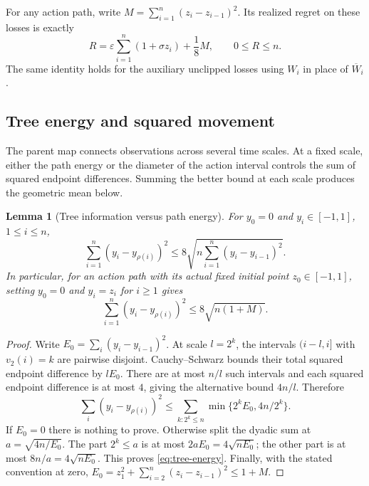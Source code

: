 \documentclass[11pt]{article}
\newtheorem{lemma}[theorem]{Lemma}
\theoremstyle{definition}
\begin{document}
For any action path, write $M=\sum_{i=1}^n(z_i-z_{i-1})^2$. Its realized regret on these losses is exactly
\begin{equation}\label{eq:path-regret}
 R=\varepsilon\sum_{i=1}^n(1+\sigma z_i)+\frac18M,
 \qquad 0\leq R\leq n.
\end{equation}
The same identity holds for the auxiliary unclipped losses using $W_i$ in place of $\overline W_i$.

\subsection{Tree energy and squared movement}

The parent map connects observations across several time scales. At a fixed scale, either the path energy or the diameter of the action interval controls the sum of squared endpoint differences. Summing the better bound at each scale produces the geometric mean below.

\begin{lemma}[Tree information versus path energy]\label{lem:tree}
For $y_0=0$ and $y_i\in[-1,1]$, $1\leq i\leq n$,
\begin{equation}\label{eq:tree-energy}
 \sum_{i=1}^n(y_i-y_{\rho(i)})^2
 \leq8\sqrt{n\sum_{i=1}^n(y_i-y_{i-1})^2}.
\end{equation}
In particular, for an action path with its actual fixed initial point $z_0\in[-1,1]$, setting $y_0=0$ and $y_i=z_i$ for $i\geq1$ gives
\begin{equation}\label{eq:tree-physical}
 \sum_{i=1}^n(y_i-y_{\rho(i)})^2\leq8\sqrt{n(1+M)}.
\end{equation}
\end{lemma}

\begin{proof}
Write $E_0=\sum_i(y_i-y_{i-1})^2$. At scale $l=2^k$, the intervals $(i-l,i]$ with $v_2(i)=k$ are pairwise disjoint. Cauchy--Schwarz bounds their total squared endpoint difference by $lE_0$. There are at most $n/l$ such intervals and each squared endpoint difference is at most $4$, giving the alternative bound $4n/l$. Therefore
\[
 \sum_i(y_i-y_{\rho(i)})^2
 \leq\sum_{k:2^k\leq n}\min\{2^kE_0,4n/2^k\}.
\]
If $E_0=0$ there is nothing to prove. Otherwise split the dyadic sum at $a=\sqrt{4n/E_0}$. The part $2^k\leq a$ is at most $2aE_0=4\sqrt{nE_0}$; the other part is at most $8n/a=4\sqrt{nE_0}$. This proves \eqref{eq:tree-energy}. Finally, with the stated convention at zero,
$E_0=z_1^2+\sum_{i=2}^n(z_i-z_{i-1})^2\leq1+M$.
\end{proof}
\end{document}
